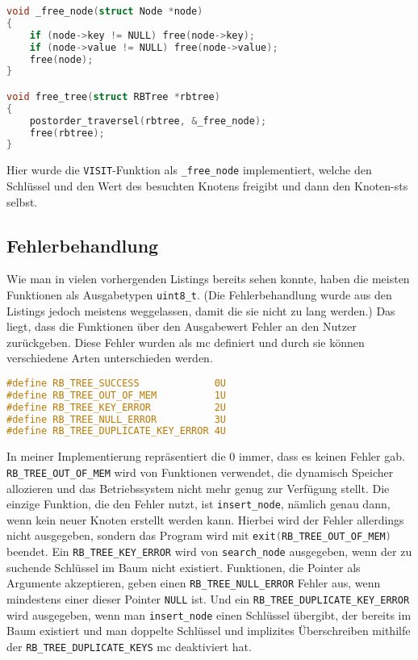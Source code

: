\documentclass[11pt]{article}
\newcommand{\lstin}[1]{\lstinline[language=C]{#1}}
\begin{document}
\begin{lstlisting}[language=C]
void _free_node(struct Node *node)
{
    if (node->key != NULL) free(node->key);
    if (node->value != NULL) free(node->value);
    free(node);
}

void free_tree(struct RBTree *rbtree)
{
    postorder_traversel(rbtree, &_free_node);
    free(rbtree);
} 
\end{lstlisting}

Hier wurde die \lstin{VISIT}-Funktion als \lstin{_free_node} implementiert, welche den Schlüssel und den Wert des besuchten Knotens freigibt und dann den Knoten-\gls{sts} selbst.

\subsection{Fehlerbehandlung} \label{err}
Wie man in vielen vorhergenden Listings bereits sehen konnte, haben die meisten Funktionen als Ausgabetypen \lstin{uint8_t}. (Die Fehlerbehandlung wurde aus den Listings jedoch meistens weggelassen, damit die sie nicht zu lang werden.)
Das liegt, dass die Funktionen über den Ausgabewert Fehler an den Nutzer zurückgeben. Diese Fehler wurden als \gls{mc} definiert und durch sie können verschiedene Arten unterschieden werden.

\begin{lstlisting}[language=C]
#define RB_TREE_SUCCESS             0U
#define RB_TREE_OUT_OF_MEM          1U
#define RB_TREE_KEY_ERROR           2U
#define RB_TREE_NULL_ERROR          3U
#define RB_TREE_DUPLICATE_KEY_ERROR 4U  
\end{lstlisting}

In meiner Implementierung repräsentiert die 0 immer, dass es keinen Fehler gab. 
\lstin{RB_TREE_OUT_OF_MEM} wird von Funktionen verwendet, die dynamisch Speicher allozieren und das Betriebssystem nicht mehr genug zur Verfügung stellt. 
Die einzige Funktion, die den Fehler nutzt, ist \lstin{insert_node}, nämlich genau dann, wenn kein neuer Knoten erstellt werden kann. 
Hierbei wird der Fehler allerdings nicht ausgegeben, sondern das Program wird mit \lstin{exit(RB_TREE_OUT_OF_MEM)} beendet. 
Ein \lstin{RB_TREE_KEY_ERROR} wird von \lstin{search_node} ausgegeben, wenn der zu suchende Schlüssel im Baum nicht existiert.
Funktionen, die Pointer als Argumente akzeptieren, geben einen \lstin{RB_TREE_NULL_ERROR} Fehler aus, wenn mindestens einer dieser Pointer \lstin{NULL} ist.
Und ein \lstin{RB_TREE_DUPLICATE_KEY_ERROR} wird ausgegeben, wenn man \lstin{insert_node} einen Schlüssel übergibt, der bereits im Baum existiert und man doppelte Schlüssel und implizites Überschreiben mithilfe der \lstin{RB_TREE_DUPLICATE_KEYS} \gls{mc} deaktiviert hat.
\end{document}
